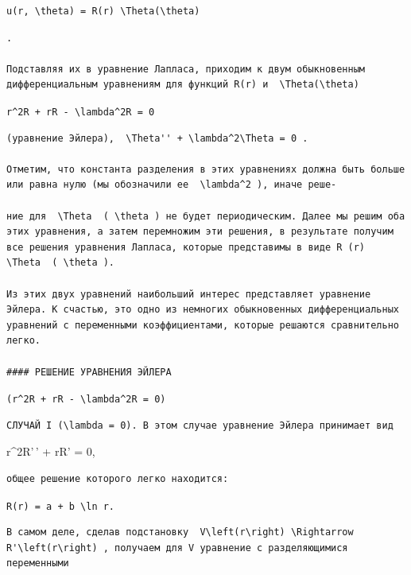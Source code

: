 \documentclass[
  ukrainian,
]{article}
\begin{document}
\begin{verbatim}
u(r, \theta) = R(r) \Theta(\theta)
\end{verbatim}

\begin{verbatim}
.

Подставляя их в уравнение Лапласа, приходим к двум обыкновенным дифференциальным уравнениям для функций R(r) и  \Theta(\theta)
\end{verbatim}

\texttt{r\^{}2R\textquotesingle{}\textquotesingle{}\ +\ rR\textquotesingle{}\ -\ \textbackslash{}lambda\^{}2R\ =\ 0}

\begin{verbatim}
(уравнение Эйлера),  \Theta'' + \lambda^2\Theta = 0 .

Отметим, что константа разделения в этих уравнениях должна быть больше или равна нулю (мы обозначили ее  \lambda^2 ), иначе реше-

ние для  \Theta  ( \theta ) не будет периодическим. Далее мы решим оба этих уравнения, а затем перемножим эти решения, в результате получим все решения уравнения Лапласа, которые представимы в виде R (r)  \Theta  ( \theta ).

Из этих двух уравнений наибольший интерес представляет уравнение Эйлера. К счастью, это одно из немногих обыкновенных дифференциальных уравнений с переменными коэффициентами, которые решаются сравнительно легко.

#### РЕШЕНИЕ УРАВНЕНИЯ ЭЙЛЕРА
\end{verbatim}

\texttt{(r\^{}2R\textquotesingle{}\textquotesingle{}\ +\ rR\textquotesingle{}\ -\ \textbackslash{}lambda\^{}2R\ =\ 0)}

\begin{verbatim}
СЛУЧАЙ I (\lambda = 0). В этом случае уравнение Эйлера принимает вид
\end{verbatim}

r\^{}2R'\,' + rR' = 0,

\begin{verbatim}
общее решение которого легко находится:
\end{verbatim}

\texttt{R(r)\ =\ a\ +\ b\ \textbackslash{}ln\ r.}

\begin{verbatim}
В самом деле, сделав подстановку  V\left(r\right) \Rightarrow R'\left(r\right) , получаем для V уравнение с разделяющимися переменными
\end{verbatim}
\end{document}

